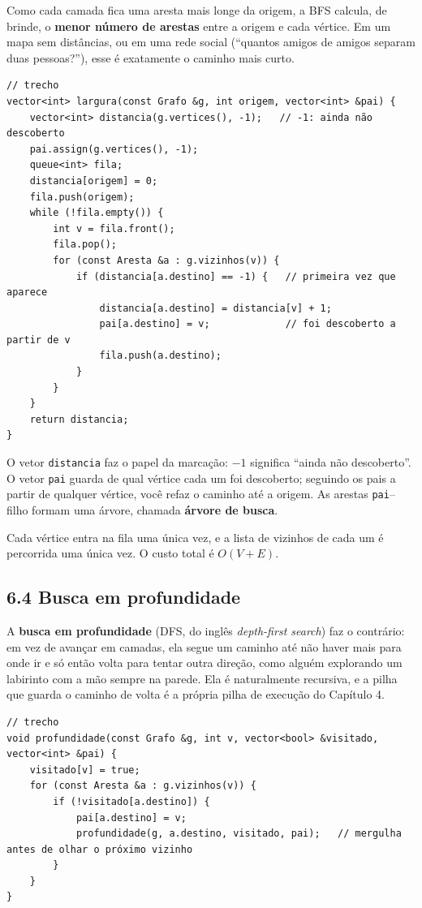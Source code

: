 Como cada camada fica uma aresta mais longe da origem, a BFS calcula, de brinde, o \textbf{menor número de arestas} entre a origem e cada vértice. Em um mapa sem distâncias, ou em uma rede social (``quantos amigos de amigos separam duas pessoas?''), esse é exatamente o caminho mais curto.

\begin{codigo}
\begin{Verbatim}[breaklines=true, breaksymbolleft={}, fontsize=\footnotesize]
// trecho
vector<int> largura(const Grafo &g, int origem, vector<int> &pai) {
    vector<int> distancia(g.vertices(), -1);   // -1: ainda não descoberto
    pai.assign(g.vertices(), -1);
    queue<int> fila;
    distancia[origem] = 0;
    fila.push(origem);
    while (!fila.empty()) {
        int v = fila.front();
        fila.pop();
        for (const Aresta &a : g.vizinhos(v)) {
            if (distancia[a.destino] == -1) {   // primeira vez que aparece
                distancia[a.destino] = distancia[v] + 1;
                pai[a.destino] = v;             // foi descoberto a partir de v
                fila.push(a.destino);
            }
        }
    }
    return distancia;
}
\end{Verbatim}
\end{codigo}

O vetor \texttt{distancia} faz o papel da marcação: $-1$ significa ``ainda não descoberto''. O vetor \texttt{pai} guarda de qual vértice cada um foi descoberto; seguindo os pais a partir de qualquer vértice, você refaz o caminho até a origem. As arestas \texttt{pai}--filho formam uma árvore, chamada \textbf{árvore de busca}.

Cada vértice entra na fila uma única vez, e a lista de vizinhos de cada um é percorrida uma única vez. O custo total é $O(V + E)$.

\subsection{6.4 Busca em profundidade}

A \textbf{busca em profundidade} (DFS, do inglês \textit{depth-first search}) faz o contrário: em vez de avançar em camadas, ela segue um caminho até não haver mais para onde ir e só então volta para tentar outra direção, como alguém explorando um labirinto com a mão sempre na parede. Ela é naturalmente recursiva, e a pilha que guarda o caminho de volta é a própria pilha de execução do Capítulo 4.

\begin{codigo}
\begin{Verbatim}[breaklines=true, breaksymbolleft={}, fontsize=\footnotesize]
// trecho
void profundidade(const Grafo &g, int v, vector<bool> &visitado, vector<int> &pai) {
    visitado[v] = true;
    for (const Aresta &a : g.vizinhos(v)) {
        if (!visitado[a.destino]) {
            pai[a.destino] = v;
            profundidade(g, a.destino, visitado, pai);   // mergulha antes de olhar o próximo vizinho
        }
    }
}
\end{Verbatim}
\end{codigo}

